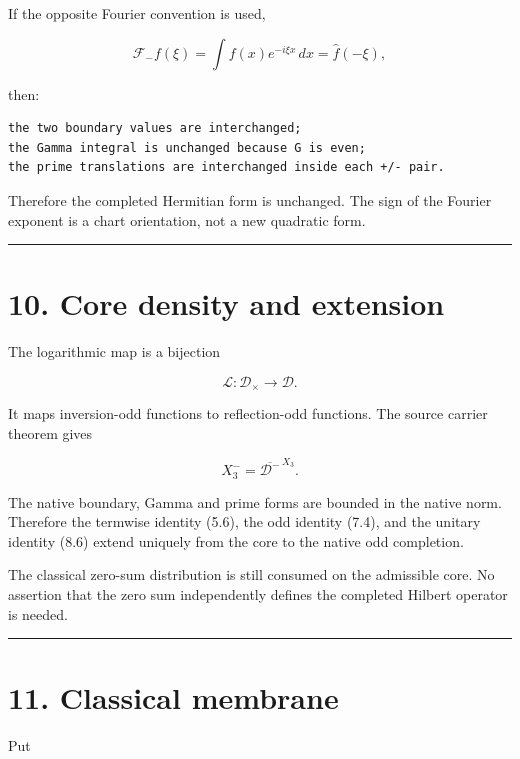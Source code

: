 If the opposite Fourier convention is used,

\[
\mathcal F_-f(\xi)
=\int f(x)e^{-i\xi x}\,dx
=\widehat f(-\xi),
\]

then:

\begin{verbatim}
the two boundary values are interchanged;
the Gamma integral is unchanged because G is even;
the prime translations are interchanged inside each +/- pair.
\end{verbatim}

Therefore the completed Hermitian form is unchanged. The sign of the Fourier
exponent is a chart orientation, not a new quadratic form.

\begin{center}\rule{0.5\linewidth}{0.5pt}\end{center}

\hypertarget{core-density-and-extension}{%
\section{10. Core density and extension}\label{core-density-and-extension}}

The logarithmic map is a bijection

\[
\mathcal L:\mathcal D_\times\longrightarrow\mathcal D.
\]

It maps inversion-odd functions to reflection-odd functions. The source carrier
theorem gives

\[
X_3^-=\overline{\mathcal D^-}^{\,X_3}.
\]

The native boundary, Gamma and prime forms are bounded in the native norm.
Therefore the termwise identity (5.6), the odd identity (7.4), and the unitary
identity (8.6) extend uniquely from the core to the native odd completion.

The classical zero-sum distribution is still consumed on the admissible core.
No assertion that the zero sum independently defines the completed Hilbert
operator is needed.

\begin{center}\rule{0.5\linewidth}{0.5pt}\end{center}

\hypertarget{classical-membrane}{%
\section{11. Classical membrane}\label{classical-membrane}}

Put

